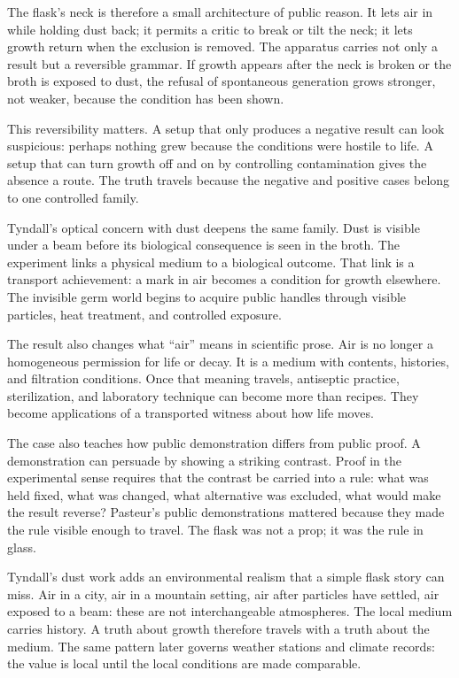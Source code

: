 The flask's neck is therefore a small architecture of public reason. It
lets air in while holding dust back; it permits a critic to break or tilt
the neck; it lets growth return when the exclusion is removed. The
apparatus carries not only a result but a reversible grammar. If growth
appears after the neck is broken or the broth is exposed to dust, the
refusal of spontaneous generation grows stronger, not weaker, because the
condition has been shown.

This reversibility matters. A setup that only produces a negative result
can look suspicious: perhaps nothing grew because the conditions were
hostile to life. A setup that can turn growth off and on by controlling
contamination gives the absence a route. The truth travels because the
negative and positive cases belong to one controlled family.

Tyndall's optical concern with dust deepens the same family. Dust is
visible under a beam before its biological consequence is seen in the
broth. The experiment links a physical medium to a biological outcome.
That link is a transport achievement: a mark in air becomes a condition
for growth elsewhere. The invisible germ world begins to acquire public
handles through visible particles, heat treatment, and controlled
exposure.

The result also changes what ``air'' means in scientific prose. Air is no
longer a homogeneous permission for life or decay. It is a medium with
contents, histories, and filtration conditions. Once that meaning travels,
antiseptic practice, sterilization, and laboratory technique can become
more than recipes. They become applications of a transported witness
about how life moves.

The case also teaches how public demonstration differs from public proof.
A demonstration can persuade by showing a striking contrast. Proof in the
experimental sense requires that the contrast be carried into a rule: what
was held fixed, what was changed, what alternative was excluded, what
would make the result reverse? Pasteur's public demonstrations mattered
because they made the rule visible enough to travel. The flask was not a
prop; it was the rule in glass.

Tyndall's dust work adds an environmental realism that a simple flask
story can miss. Air in a city, air in a mountain setting, air after
particles have settled, air exposed to a beam: these are not
interchangeable atmospheres. The local medium carries history. A truth
about growth therefore travels with a truth about the medium. The same
pattern later governs weather stations and climate records: the value is
local until the local conditions are made comparable.

